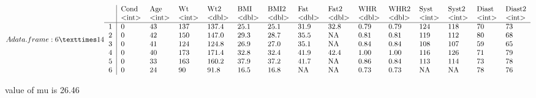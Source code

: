 \documentclass[letterpaper,10pt,english]{jupyterBook}
\begin{document}
\begin{sphinxVerbatim}[commandchars=\\\{\}]
  
  \PYG{p}{[}\PYG{p}{]}
  
  
\end{sphinxVerbatim}
\begin{equation*}
\begin{split}A data.frame: 6 × 14
\begin{tabular}{r|llllllllllllll}
  & Cond & Age & Wt & Wt2 & BMI & BMI2 & Fat & Fat2 & WHR & WHR2 & Syst & Syst2 & Diast & Diast2\\
  & <int> & <int> & <int> & <dbl> & <dbl> & <dbl> & <dbl> & <dbl> & <dbl> & <dbl> & <int> & <int> & <int> & <int>\\
\hline
	1 & 0 & 43 & 137 & 137.4 & 25.1 & 25.1 & 31.9 & 32.8 & 0.79 & 0.79 & 124 & 118 & 70 & 73\\
	2 & 0 & 42 & 150 & 147.0 & 29.3 & 28.7 & 35.5 &   NA & 0.81 & 0.81 & 119 & 112 & 80 & 68\\
	3 & 0 & 41 & 124 & 124.8 & 26.9 & 27.0 & 35.1 &   NA & 0.84 & 0.84 & 108 & 107 & 59 & 65\\
	4 & 0 & 40 & 173 & 171.4 & 32.8 & 32.4 & 41.9 & 42.4 & 1.00 & 1.00 & 116 & 126 & 71 & 79\\
	5 & 0 & 33 & 163 & 160.2 & 37.9 & 37.2 & 41.7 &   NA & 0.86 & 0.84 & 113 & 114 & 73 & 78\\
	6 & 0 & 24 &  90 &  91.8 & 16.5 & 16.8 &   NA &   NA & 0.73 & 0.73 &  NA &  NA & 78 & 76\\
\end{tabular}\end{split}
\end{equation*}
\begin{sphinxVerbatim}[commandchars=\\\{\}]
[1] \PYGZdq{}value of mu is 26.46\PYGZdq{}
\end{sphinxVerbatim}
\end{document}
